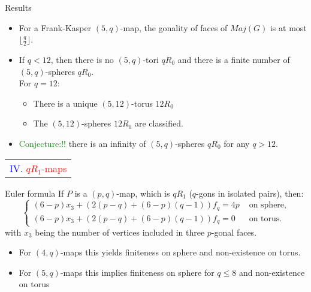 \documentclass[%
pdf,
colorBG,
slideColor,
]{prosper}
\begin{document}
\begin{slide}{Results}
\begin{itemize}
\item For a Frank-Kasper $(5,q)$-map, the gonality of faces of $Maj(G)$ is at most $\lfloor \frac{q}{2}\rfloor$.
\item If $q<12$, then there is no $(5,q)$-tori $qR_0$ and there is a finite number of $(5,q)$-spheres $qR_0$.\\
For $q=12$:

\begin{minipage}{5.2cm}
\begin{itemize}
\item There is a unique $(5,12)$-torus $12R_0$
\item The $(5,12)$-spheres $12R_0$ are classified.
\end{itemize}
\vspace{0.7cm}
\end{minipage}
\begin{minipage}{5.2cm}
\centering
{}\par
\end{minipage}
\item \textcolor{green}{Conjecture:!!} there is an infinity of 
$(5,q)$-spheres $qR_0$ for any $q>12$.
\end{itemize}
\end{slide}


\begin{slide}{}
\begin{center}
{\Huge 
\begin{tabular*}{7cm}{c}
\\[-0.5cm]
\textcolor{blue}{IV. }\textcolor{red}{$qR_1$-maps}
\end{tabular*}
}
\end{center}
\end{slide}



\begin{slide}{Euler formula}
If $P$ is a $(p,q)$-map, which is $qR_1$ ($q$-gons in isolated pairs), then:
\begin{equation*}
\left\lbrace\begin{array}{rl}
(6-p)x_3+(2(p-q)+(6-p)(q-1) )f_q=4p  &\mbox{~on~sphere},\\
(6-p)x_3+(2(p-q)+(6-p)(q-1) )f_q=0   &\mbox{~on~torus}.
\end{array}\right.
\end{equation*}
with $x_3$ being the number of vertices included in three $p$-gonal faces.

\begin{itemize}
\item For $(4,q)$-maps this yields finiteness on sphere and non-existence
on torus. 
\item For $(5,q)$-maps this implies finiteness on sphere for $q\leq 8$ and non-existence on torus
\end{itemize}

\end{slide}
\end{document}
